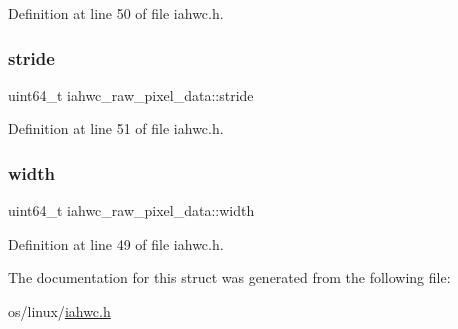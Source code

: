 Definition at line 50 of file iahwc.\+h.

\mbox{\label{structiahwc__raw__pixel__data_a7b63e928cb013a04cfe12a69a4cf7241}} 
\subsubsection{\texorpdfstring{stride}{stride}}
{\footnotesize\ttfamily uint64\+\_\+t iahwc\+\_\+raw\+\_\+pixel\+\_\+data\+::stride}



Definition at line 51 of file iahwc.\+h.

\mbox{\label{structiahwc__raw__pixel__data_afa9b60fc4678e26c901c703837fdabb3}} 
\subsubsection{\texorpdfstring{width}{width}}
{\footnotesize\ttfamily uint64\+\_\+t iahwc\+\_\+raw\+\_\+pixel\+\_\+data\+::width}



Definition at line 49 of file iahwc.\+h.



The documentation for this struct was generated from the following file\+:\begin{DoxyCompactItemize}
\item 
os/linux/\mbox{\hyperlink{iahwc_8h}{iahwc.\+h}}\end{DoxyCompactItemize}

